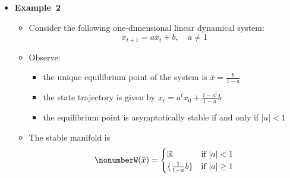 \documentclass[12pt,a4paper]{article}
\begin{document}
\begin{itemize}
\item \textbf{Example~2}
  \begin{itemize}
  \item Consider the following one-dimensional linear dynamical system:
    \begin{equation}\nonumber%
      x_{t+1} = a x_{t} + b, \quad a \neq 1
    \end{equation}
  \item Observe:
    \begin{itemize}
    \item the unique equilibrium point of the system is $\bar{x}= \frac{b}{1-a}$
    \item the state trajectory is given by $x_{t} = a^{t} x_{0} + \frac{1-a^{t}}{1-a}b$
    \item the equilibrium point is asymptotically stable if and only if $|a|<1$
    \end{itemize}
  \item The stable manifold is
    \begin{equation}\nonumber%
      W(\bar{x}) =
      \begin{cases}
        \R & \text{if $|a|<1$} \\
        \{\frac{1}{1-a}b\} & \text{if $|a|\geq 1$} \\
      \end{cases}
    \end{equation}
  \end{itemize}


\end{itemize}
\end{document}
